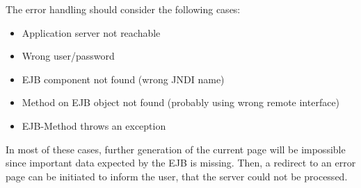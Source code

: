 The error handling should consider the following cases:

\begin{itemize}
\item Application server not reachable
\item Wrong user/password
\item EJB component not found (wrong JNDI name)
\item Method on EJB object not found (probably using wrong remote
interface)
\item EJB-Method throws an exception
\end{itemize}

In most of these cases, further generation of the current page will be
impossible since important data expected by the EJB is missing. Then, a
redirect to an error page can be initiated to inform the user, that the
server could not be processed.


